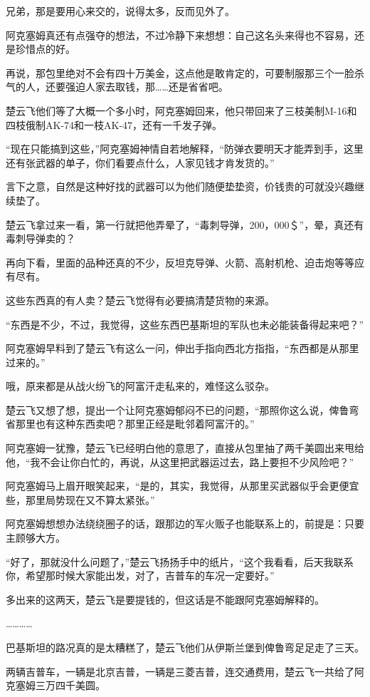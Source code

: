 兄弟，那是要用心来交的，说得太多，反而见外了。

阿克塞姆真还有点强夺的想法，不过冷静下来想想：自己这名头来得也不容易，还是珍惜点的好。

再说，那包里绝对不会有四十万美金，这点他是敢肯定的，可要制服那三个一脸杀气的人，还要强迫人家去取钱，那……还是省省吧。

楚云飞他们等了大概一个多小时，阿克塞姆回来，他只带回来了三枝美制M-16和四枝俄制AK-74和一枝AK-47，还有一千发子弹。

“现在只能搞到这些，”阿克塞姆神情自若地解释，“防弹衣要明天才能弄到手，这里还有张武器的单子，你们看要点什么，人家见钱才肯发货的。”

言下之意，自然是这种好找的武器可以为他们随便垫垫资，价钱贵的可就没兴趣继续垫了。

楚云飞拿过来一看，第一行就把他弄晕了，“毒刺导弹，200，000＄”，晕，真还有毒刺导弹卖的？

再向下看，里面的品种还真的不少，反坦克导弹、火箭、高射机枪、迫击炮等等应有尽有。

这些东西真的有人卖？楚云飞觉得有必要搞清楚货物的来源。

“东西是不少，不过，我觉得，这些东西巴基斯坦的军队也未必能装备得起来吧？”

阿克塞姆早料到了楚云飞有这么一问，伸出手指向西北方指指，“东西都是从那里过来的。”

哦，原来都是从战火纷飞的阿富汗走私来的，难怪这么驳杂。

楚云飞又想了想，提出一个让阿克塞姆郁闷不已的问题，“那照你这么说，俾鲁弯省那里也有这种东西卖吧？那里正经是毗邻着阿富汗的。”

阿克塞姆一犹豫，楚云飞已经明白他的意思了，直接从包里抽了两千美圆出来甩给他，“我不会让你白忙的，再说，从这里把武器运过去，路上要担不少风险吧？”

阿克塞姆马上眉开眼笑起来，“是的，其实，我觉得，从那里买武器似乎会更便宜些，那里局势现在又不算太紧张。”

阿克塞姆想想办法绕绕圈子的话，跟那边的军火贩子也能联系上的，前提是：只要主顾够大方。

“好了，那就没什么问题了，”楚云飞扬扬手中的纸片，“这个我看看，后天我联系你，希望那时候大家能出发，对了，吉普车的车况一定要好。”

多出来的这两天，楚云飞是要提钱的，但这话是不能跟阿克塞姆解释的。

…………

巴基斯坦的路况真的是太糟糕了，楚云飞他们从伊斯兰堡到俾鲁弯足足走了三天。

两辆吉普车，一辆是北京吉普，一辆是三菱吉普，连交通费用，楚云飞一共给了阿克塞姆三万四千美圆。

